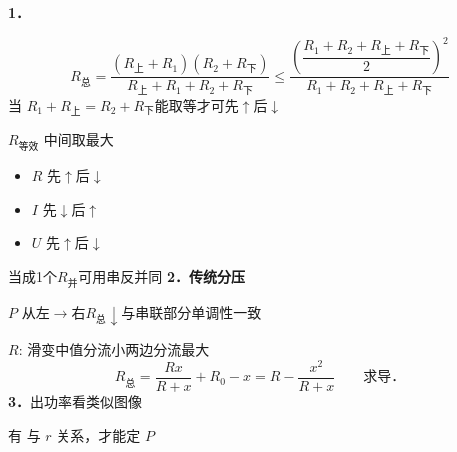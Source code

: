 \textbf{1．}


\[R_{\text{总}}=\frac{(R_{\text{上}}+R_1)(R_2+R_{\text{下}})}{R_{\text{上}}+R_1+R_2+R_{\text{下}}}\le\frac{\left(\dfrac{R_1+R_2+R_{\text{上}}+R_{\text{下}}}{2}\right)^2}{R_1+R_2+R_{\text{上}}+R_{\text{下}}}\]
当 $R_1+R_{\text{上}}=R_2+R_{\text{下}}$\quad 能取等才可先$\uparrow$后$\downarrow$

$R_{\text{等效}}$ 中间取最大
\begin{itemize}
\item $R$ 先$\uparrow$后$\downarrow$
\item $I$ 先$\downarrow$后$\uparrow$
\item $U$ 先$\uparrow$后$\downarrow$
\end{itemize}
当成1个$R_{\text{并}}$可用串反并同
\textbf{2．传统分压}


$P$ 从左$\to$右\quad $R_{\text{总}}\downarrow$\quad 与串联部分单调性一致 %

$R$: 滑变中值分流小\quad 两边分流最大
\[R_{\text{总}}=\frac{Rx}{R+x}+R_0-x=R-\frac{x^2}{R+x}\qquad\text{求导．}\]
\textbf{3．}出功率看类似图像


有  与 $r$ 关系，才能定 $P$

